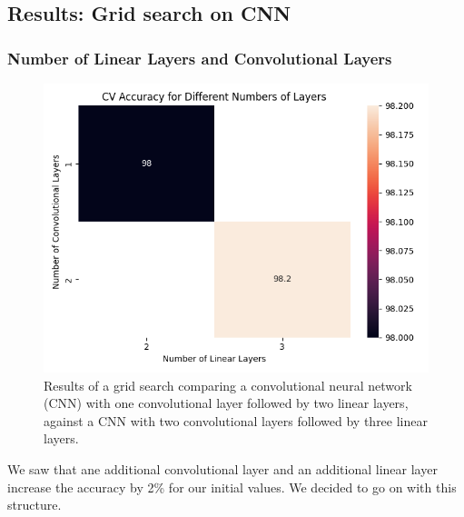 \subsection{Results: Grid search on CNN}

\subsubsection{Number of Linear Layers and Convolutional Layers}
\begin{figure}[H]
    \centering
    \includegraphics[width=\textwidth]{results/cnn_grid_search/heatmap_grid_search_layers.png}
    \caption{Results of a grid search comparing a convolutional neural network (CNN) with one convolutional layer followed by two linear layers, against a CNN with two convolutional layers followed by three linear layers.}
    \label{fig:cnn:layers}
\end{figure}

We saw that ane additional convolutional layer and an additional linear layer increase the accuracy by 2\% for our initial values. We decided to go on with this structure.

